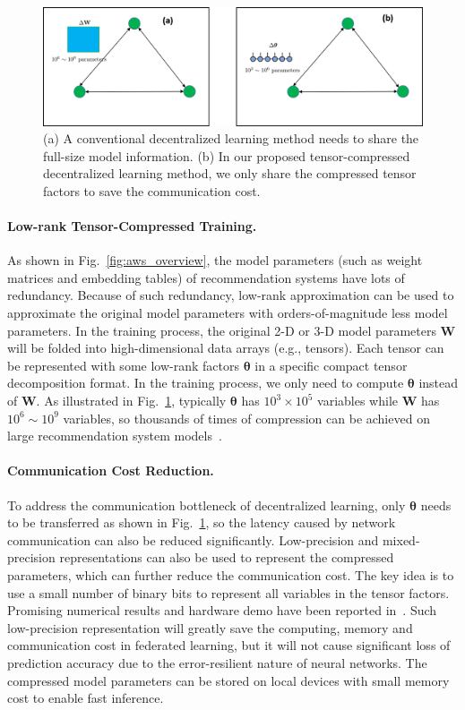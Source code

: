 \documentclass[11pt,letterpaper]{article}
\newcommand{\mat}[1]{\mathbf{#1}}
\begin{document}
\begin{figure}[t]
\centering
	\includegraphics[width=6in]{fig/TT_FL.png}
\caption{(a) A conventional decentralized learning method needs to share the full-size model information. (b) In our proposed tensor-compressed decentralized learning method, we only share the compressed tensor factors to save the communication cost. } 
\label{fig:TT_FL}
\vspace{-10pt}
\end{figure}

\paragraph{Low-rank Tensor-Compressed Training.} As shown in Fig.~\ref{fig:aws_overview}, the model parameters (such as weight matrices and embedding tables) of recommendation systems have lots of redundancy. Because of such redundancy, low-rank approximation can be used to approximate the original model parameters with orders-of-magnitude less model parameters. In the training process, the original 2-D or 3-D model parameters $\mat{W}$ will be folded into high-dimensional data arrays (e.g., tensors). Each tensor can be represented with some low-rank factors $\boldsymbol{\theta}$ in a specific compact tensor decomposition format. In the training process, we only need to compute $\boldsymbol{\theta}$ instead of $\mat{W}$. As illustrated in Fig.~\ref{fig:TT_FL}, typically $\boldsymbol{\theta}$ has $10^3 \times 10^5$ variables while $\mat{W}$ has $10^6 \sim 10^9$ variables, so thousands of times of compression can be achieved on large recommendation system models~\cite{hawkins2022towards}. 

\paragraph{Communication Cost Reduction.} To address the communication bottleneck of decentralized learning, only $\boldsymbol{\theta}$ needs to be transferred as shown in Fig.~\ref{fig:TT_FL}, so the latency caused by network communication can also be reduced significantly. Low-precision and mixed-precision representations can also be used to represent the compressed parameters, which can further reduce the communication cost. The key idea is to use a small number of binary bits to represent all variables in the tensor factors. Promising numerical results and hardware demo have been reported in~\cite{yang2022hardware,zhang2021fpga}. Such low-precision representation will greatly save the computing, memory and communication cost in federated learning, but it will not cause significant loss of prediction accuracy due to the error-resilient nature of neural networks. The compressed model parameters can be stored on local devices with small memory cost to enable fast inference. 
\end{document}
